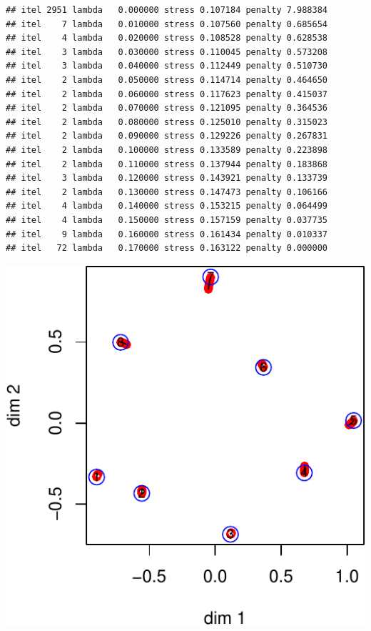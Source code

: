\documentclass[
  12pt,
]{article}
\begin{document}
\begin{verbatim}
## itel 2951 lambda   0.000000 stress 0.107184 penalty 7.988384 
## itel    7 lambda   0.010000 stress 0.107560 penalty 0.685654 
## itel    4 lambda   0.020000 stress 0.108528 penalty 0.628538 
## itel    3 lambda   0.030000 stress 0.110045 penalty 0.573208 
## itel    3 lambda   0.040000 stress 0.112449 penalty 0.510730 
## itel    2 lambda   0.050000 stress 0.114714 penalty 0.464650 
## itel    2 lambda   0.060000 stress 0.117623 penalty 0.415037 
## itel    2 lambda   0.070000 stress 0.121095 penalty 0.364536 
## itel    2 lambda   0.080000 stress 0.125010 penalty 0.315023 
## itel    2 lambda   0.090000 stress 0.129226 penalty 0.267831 
## itel    2 lambda   0.100000 stress 0.133589 penalty 0.223898 
## itel    2 lambda   0.110000 stress 0.137944 penalty 0.183868 
## itel    3 lambda   0.120000 stress 0.143921 penalty 0.133739 
## itel    2 lambda   0.130000 stress 0.147473 penalty 0.106166 
## itel    4 lambda   0.140000 stress 0.153215 penalty 0.064499 
## itel    4 lambda   0.150000 stress 0.157159 penalty 0.037735 
## itel    9 lambda   0.160000 stress 0.161434 penalty 0.010337 
## itel   72 lambda   0.170000 stress 0.163122 penalty 0.000000
\end{verbatim}

\begin{center}\includegraphics{penalty_files/figure-latex/intelligence-1} \end{center}
\end{document}
